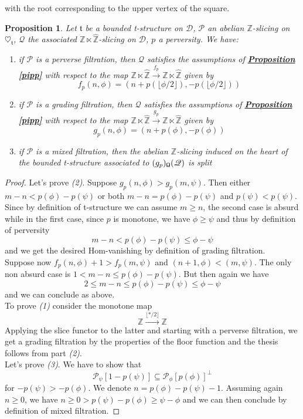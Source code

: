 \documentclass{article}
\newtheorem{prop}[thm]{Proposition}
\theoremstyle{definition}
\begin{document}
with the root corresponding to the upper vertex of the square. 

\begin{prop}\label{grad}
Let $\mathfrak{t}$ be a bounded t-structure on $\mathscr{D}$, $\mathscr{P}$ an abelian $\mathbb{Z}$-slicing on $\heartsuit_{\mathfrak{t}}$, $\mathscr{Q}$ the associated $\mathbb{Z} \ltimes \hat{\mathbb{Z}}$-slicing on $\mathscr{D}$, $p$ a perversity. We have: 
\begin{enumerate}
\item if $\mathscr{P}$ is a perverse filtration, then $\mathscr{Q}$ satisfies the assumptions of \hyperref[pipp]{\textbf{Proposition \ref*{pipp}}} with respect to the map $\mathbb{Z} \ltimes \hat{\mathbb{Z}} \overset{f_p}{\longrightarrow} \mathbb{Z} \ltimes \hat{\mathbb{Z}}$ given by $$f_p(n,\phi)=(n+p(\lfloor \phi / 2 \rfloor),-p(\lfloor \phi / 2 \rfloor))$$ 
\item if $\mathscr{P}$ is a grading filtration, then $\mathscr{Q}$ satisfies the assumptions of \hyperref[pipp]{\textbf{Proposition \ref*{pipp}}} with respect to the map $\mathbb{Z} \ltimes \hat{\mathbb{Z}} \overset{g_p}{\longrightarrow} \mathbb{Z} \ltimes \hat{\mathbb{Z}}$ given by $$g_p(n,\phi)=(n+p(\phi),-p(\phi))$$ 
\item if $\mathscr{P}$ is a mixed filtration, then the abelian $\mathbb{Z}$-slicing induced on the heart of the bounded t-structure associated to $(g_p)_{\textnormal{\Libra}}(\mathscr{Q})$ is split 
\end{enumerate}
\end{prop}

\begin{proof}
Let's prove \textit{(2)}. Suppose $g_p(n,\phi) > g_p(m,\psi)$. Then either $m-n< p(\phi) - p(\psi)$ or both $m-n = p(\phi) - p(\psi)$ and $p(\psi) < p(\psi)$. Since by definition of t-structure we can assume $m \ge n$, the second case is absurd while in the first case, since $p$ is monotone, we have $\phi \ge \psi$ and thus by definition of perversity $$m-n<p(\phi)-p(\psi) \le \phi - \psi$$ 
and we get the desired Hom-vanishing by definition of grading filtration. \\

Suppose now $f_p(n,\phi) + 1 > f_p(m,\psi)$ and $(n+1,\phi) < (m,\psi)$. The only non absurd case is $ 1<m-n \le  p(\phi) - p(\psi)$. But then again we have $$2 \le m-n \le p(\phi)-p(\psi) \le \phi - \psi$$
and we can conclude as above. \\

To prove \textit{(1)} consider the monotone map $$\mathbb{Z} \overset{\lfloor * / 2 \rfloor}{\longrightarrow} \mathbb{Z}$$
Applying the slice functor to the latter and starting with a perverse filtration, we get a grading filtration by the properties of the floor function and the thesis follows from part \textit{(2)}. \\ 

Let's prove \textit{(3)}. We have to show that $$\mathscr{P}_{\psi}[1-p(\psi)] \subseteq \mathscr{P}_{\phi }[p(\phi)]^{\perp}$$ 
for $-p(\psi)>-p(\phi)$. We denote $n=p(\phi)-p(\psi)-1$. Assuming again $n \ge 0$, we have $n \ge 0 > p(\psi) - p(\phi) \ge \psi - \phi$ and we can then conclude by definition of mixed filtration. 
\end{proof}
\end{document}
